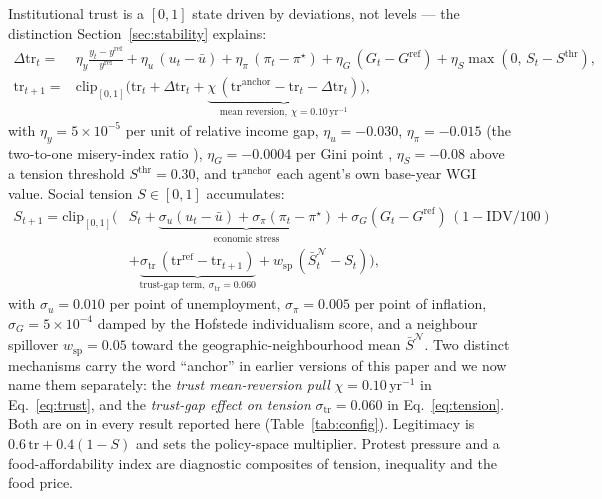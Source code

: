 \documentclass[12pt,a4paper]{article}
\begin{document}
Institutional trust is a $[0,1]$ state driven by deviations, not levels --- the distinction
Section~\ref{sec:stability} explains:
\begin{equation}
\begin{aligned}
\Delta\mathrm{tr}_t = {}& \eta_{y}\frac{y_t - y^{\mathrm{ref}}}{y^{\mathrm{ref}}}
 + \eta_u\,(u_t-\bar u) + \eta_\pi\,(\pi_t-\pi^{\star})
 + \eta_G\,(G_t-G^{\mathrm{ref}})
 + \eta_S\max(0,\,S_t-S^{\mathrm{thr}}),\\
\mathrm{tr}_{t+1} = {}& \mathrm{clip}_{[0,1]}\Big(
   \mathrm{tr}_t+\Delta\mathrm{tr}_t
   + \underbrace{\chi\,(\mathrm{tr}^{\mathrm{anchor}}-\mathrm{tr}_t-\Delta\mathrm{tr}_t)}
     _{\text{mean reversion},\ \chi=0.10\,\mathrm{yr}^{-1}}\Big),
\end{aligned}
\label{eq:trust}
\end{equation}
with $\eta_y=5\times10^{-5}$ per unit of relative income gap, $\eta_u=-0.030$,
$\eta_\pi=-0.015$ (the two-to-one misery-index ratio \citep{ditella2001}), $\eta_G=-0.0004$
per Gini point \citep{wilkinson2009}, $\eta_S=-0.08$ above a tension threshold
$S^{\mathrm{thr}}=0.30$, and $\mathrm{tr}^{\mathrm{anchor}}$ each agent's own base-year WGI
value. Social tension $S\in[0,1]$ accumulates:
\begin{equation}
\begin{aligned}
S_{t+1} = \mathrm{clip}_{[0,1]}\Big(&S_t
 + \underbrace{\sigma_u (u_t-\bar u)+\sigma_\pi(\pi_t-\pi^{\star})}_{\text{economic stress}}
 + \sigma_G (G_t-G^{\mathrm{ref}})\,(1-\mathrm{IDV}/100)\\
 &+ \underbrace{\sigma_{\mathrm{tr}}\,(\mathrm{tr}^{\mathrm{ref}}-\mathrm{tr}_{t+1})}
   _{\text{trust-gap term},\ \sigma_{\mathrm{tr}}=0.060}
 + w_{\mathrm{sp}}\,(\bar S^{\mathcal N}_t - S_t)\Big),
\end{aligned}
\label{eq:tension}
\end{equation}
with $\sigma_u=0.010$ per point of unemployment, $\sigma_\pi=0.005$ per point of inflation,
$\sigma_G=5\times10^{-4}$ damped by the Hofstede individualism score, and a neighbour
spillover $w_{\mathrm{sp}}=0.05$ toward the geographic-neighbourhood mean $\bar S^{\mathcal
N}$. Two distinct mechanisms carry the word ``anchor'' in earlier versions of this paper and we
now name them separately: the \emph{trust mean-reversion pull} $\chi=0.10$\,yr$^{-1}$ in
Eq.~\ref{eq:trust}, and the \emph{trust-gap effect on tension} $\sigma_{\mathrm{tr}}=0.060$ in
Eq.~\ref{eq:tension}. Both are on in every result reported here (Table~\ref{tab:config}).
Legitimacy is $0.6\,\mathrm{tr}+0.4(1-S)$ and sets the policy-space multiplier. Protest
pressure and a food-affordability index are diagnostic composites of tension, inequality and
the food price.
\end{document}
